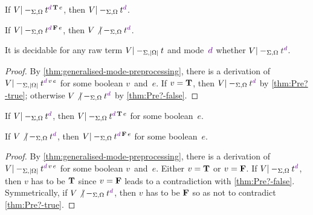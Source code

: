 \begin{lemma}\label{thm:Pre?-true}
If\/ $V |-_{\Sigma,\Omega} t^{\dir{d}\,\True\,e}$, then $V |-_{\Sigma,\Omega} t^\dir{d}$.
\end{lemma}

\begin{lemma}\label{thm:Pre?-false}
If\/ $V |-_{\Sigma,\Omega} t^{\dir{d}\,\False\,e}$, then $V \not|-_{\Sigma,\Omega} t^\dir{d}$.
\end{lemma}

\begin{corollary}\label{thm:mode-preprocessing}
  It is decidable for any raw term $V |-_{\Sigma,\left|\Omega\right|} t$ and mode~$\dir{d}$ whether $V |-_{\Sigma,\Omega} \isTerm{t}^\dir{d}$.
\end{corollary}

\begin{proof}
By \cref{thm:generalised-mode-preprocessing}, there is a derivation of $V |-_{\Sigma,\erase\Omega} t^{\dir{d}\,v\,e}$ for some boolean $v$~and~$e$.
If $v = \mathbf{T}$, then $V |-_{\Sigma,\Omega} t^\dir{d}$ by \cref{thm:Pre?-true}; otherwise $V \not|-_{\Sigma,\Omega} t^\dir{d}$ by \cref{thm:Pre?-false}.
\end{proof}

\begin{corollary}
If\/ $V |-_{\Sigma,\Omega} t^\dir{d}$, then $V |-_{\Sigma,\Omega} t^{\dir{d}\,\True\,e}$ for some boolean~$e$.
\end{corollary}

\begin{corollary}
If\/ $V \not|-_{\Sigma,\Omega} t^\dir{d}$, then $V |-_{\Sigma,\Omega} t^{\dir{d}\,\False\,e}$ for some boolean~$e$.
\end{corollary}

\begin{proof}
By \cref{thm:generalised-mode-preprocessing}, there is a derivation of $V |-_{\Sigma,\erase\Omega} t^{\dir{d}\,v\,e}$ for some boolean $v$~and~$e$.
Either $v = \mathbf{T}$ or $v = \mathbf{F}$.
If $V |-_{\Sigma,\Omega} t^\dir{d}$, then $v$ has to be $\mathbf{T}$ since $v = \mathbf{F}$ leads to a contradiction with \cref{thm:Pre?-false}.
Symmetrically, if $V \not|-_{\Sigma,\Omega} t^\dir{d}$, then $v$ has to be $\mathbf{F}$ so as not to contradict \cref{thm:Pre?-true}.
\end{proof}


